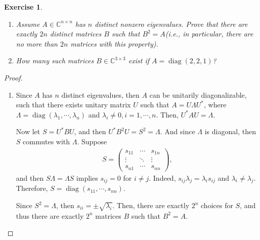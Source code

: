 \documentclass[11pt]{article}
\newtheorem{exercise}{Exercise}[section]
\theoremstyle{definition}
\numberwithin{equation}{subsection}
\begin{document}
\medskip

\begin{exercise}
~\begin{enumerate}[label=(\alph*)]
    \item Assume $A \in \mathbb{C}^{n \times n}$ has $n$ distinct nonzero eigenvalues. Prove that there are exactly $2n$ distinct matrices $B$ such that $B^2 = A$(i.e., in particular, there are no more than $2n$ matrices with this property).
    
    \item How many such matrices $B \in \mathbb{C}^{3 \times 3}$ exist if $A = \operatorname{diag}(2, 2, 1)$?
\end{enumerate}
\end{exercise}
\begin{proof}
~\begin{enumerate}[label=(\alph*)]
    \item Since $A$ has $n$ distinct eigenvalues, then $A$ can be unitarily diagonalizable, such that there exists unitary matrix $U$ such that $A = U \Lambda U^*$, where $\Lambda = \operatorname{diag}(\lambda_1, \cdots, \lambda_n)$ and $\lambda_i \neq 0, i = 1, \cdots, n$. Then, $U^* A U = \Lambda$.
    
    Now let $S = U^* B U$, and then $U^* B^2 U = S^2 = \Lambda$. And since $\Lambda$ is diagonal, then $S$ commutes with $\Lambda$. Suppose
    \begin{align*}
        S = \begin{pmatrix}
            s_{11} & \cdots & s_{1n} \\
            \vdots & \ddots & \vdots \\
            s_{n1} & \cdots & s_{nn}
        \end{pmatrix},
    \end{align*}
    and then $S \Lambda = \Lambda S$ implies $s_{ij} = 0$ for $i \neq j$. Indeed, $s_{ij} \lambda_j = \lambda_i s_{ij}$ and $\lambda_i \neq \lambda_j$. Therefore, $S = \operatorname{diag}(s_{11}, \cdots, s_{nn})$.
    
    Since $S^2 = \Lambda$, then $s_{ii} = \pm \sqrt{\lambda_i}$. Then, there are exactly $2^n$ choices for $S$, and thus there are exactly $2^n$ matrices $B$ such that $B^2 = A$.
    

\end{enumerate}
\end{proof}
\end{document}
